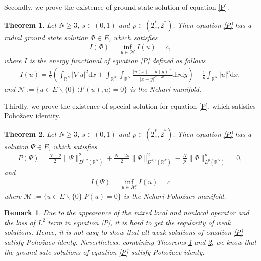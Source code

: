 \documentclass[12pt,a4paper,reqno]{amsart}
\numberwithin{equation}{section}
\newtheorem{theorem}{Theorem}[section]
\newtheorem{remark}{Remark}[section]
\begin{document}
Secondly,
we prove the existence of ground state solution of equation \eqref{P}.
\begin{theorem}\label{Theorem1.2}
Let $N\geqslant3$, $s\in(0,1)$ and $p\in (2^{*}_{s},2^{*})$. Then equation \eqref{P} has a radial ground state solution $\Phi\in E$, which satisfies
\begin{equation*}
\begin{aligned}
I(\Phi)=\inf_{u\in \mathcal{N}}I(u)=c,
\end{aligned}
\end{equation*}
where $I$ is the energy functional of equation \eqref{P} defined as follows
\begin{equation*}
\begin{aligned}
I(u)=
\frac{1}{2}
\left(
\int_{\mathbb{R}^{N}}
|\nabla u|^{2}
\mathrm{d}x
+
\int_{\mathbb{R}^{N}}\int_{\mathbb{R}^{N}}\frac{|u(x)-u(y)|^{2}}{|x-y|^{N+2s}}
\mathrm{d}x\mathrm{d}y\right)
-
\frac{1}{p}
\int_{\mathbb{R}^{N}}
|u|^{p}
\mathrm{d}x,
\end{aligned}
\end{equation*}
and $\mathcal{N}:=\{u\in E\backslash\{0\}|\langle I'(u),u\rangle=0\}$ is the Nehari manifold.
\end{theorem}

Thirdly,
we prove the existence of special solution for equation \eqref{P}, which satisfies Poho\v{z}aev identity.
\begin{theorem}\label{Theorem1.3}
Let $N\geqslant3$, $s\in(0,1)$ and $p\in (2^{*}_{s},2^{*})$.
Then equation \eqref{P} has a solution $\Psi\in E$, which satisfies
\begin{equation*}
\begin{aligned}
P(\Psi)=\frac{N-2}{2}
\|\Psi\|^{2}_{D^{1,2}(\mathbb{R}^{N})}
+
\frac{N-2s}{2}
\|\Psi\|^{2}_{D^{s,2}(\mathbb{R}^{N})}
-\frac{N}{p}\|\Phi\|_{L^{p}(\mathbb{R}^{N})}^{p}=0,
\end{aligned}
\end{equation*}
and
\begin{equation*}
\begin{aligned}
I(\Psi)=\inf_{u\in \mathcal{M}}I(u)=c
\end{aligned}
\end{equation*}
where $\mathcal{M}:=\{u\in E\backslash\{0\}|P(u)=0\}$ is the Nehari-Poho\v{z}aev manifold.
\end{theorem}

\begin{remark}
Due to the appearance of the mixed local and nonlocal operator and the loss of $L^{2}$ term in equation \eqref{P}, it is hard to get the regularity of weak solutions.
Hence, it is not easy to show that all weak solutions of equation \eqref{P} satisfy Poho\v{z}aev identy.
Nevertheless,
combining Theorems \ref{Theorem1.2} and \ref{Theorem1.3}, we know that the ground sate solutions of equation \eqref{P} satisfy Poho\v{z}aev identy.
\end{remark}
\end{document}
